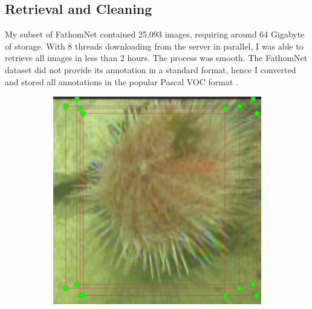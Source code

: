 \documentclass[12pt,a4paper,twoside,openany]{report}
\begin{document}
\subsection{Retrieval and Cleaning}
My subset of FathomNet contained 25,093 images, requiring around 64 Gigabyte of storage. With 8 threads downloading from the server in parallel, I was able to retrieve all images in less than 2 hours. The process was smooth. The FathomNet dataset did not provide its annotation in a standard format, hence I converted and stored all annotations in the popular Pascal VOC format \cite{everingham_pascal_2010}.

\begin{figure}[H]
    \begin{subfigure}[b]{0.45\textwidth}
        \centering
        \includegraphics[width=\textwidth]{figs/implementation/fathomnet_problems/duplicate.png}
        \label{fig:fathomnet_duplicate}
    \end{subfigure}
    \hfill
    \begin{subfigure}[b]{0.45\textwidth}
        \centering

\end{subfigure}
\end{figure}
\end{document}
